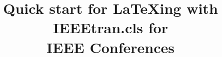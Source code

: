 \documentclass[conference]{IEEEtran}[2015/08/26]
\begin{document}

\title{Quick start for LaTeXing with IEEEtran.cls for\\ IEEE Conferences}

\author{%
  \and
}


\maketitle

%
%
\iffalse
    \makeatletter
    \def\ps@IEEEtitlepagestyle{%
      \def\@oddfoot{\mycopyrightnotice}%
      \def\@evenfoot{}%
    }
    \makeatother
    \def\mycopyrightnotice{%
      \begin{minipage}{\textwidth}
        \footnotesize
        1551-3203 \copyright 2015 IEEE.
        Personal use is permitted, but republication/redistribution requires IEEE permission.
        \\
        See \url{https://www.ieee.org/publications_standards/publications/rights/index.html} for more information.
      \end{minipage}
      \gdef\mycopyrightnotice{}%
    }
\fi

\begin{abstract}
  \blindtext
\end{abstract}

%
\IEEEpeerreviewmaketitle
\end{document}
